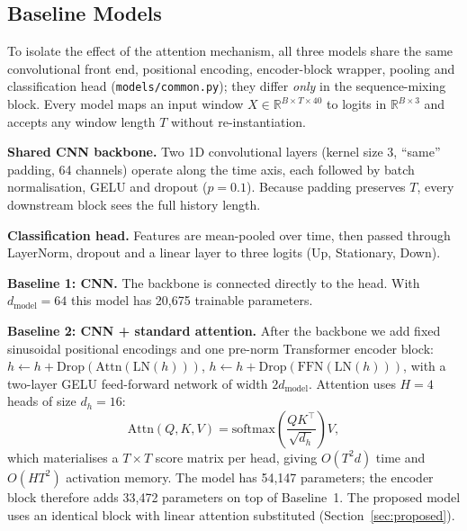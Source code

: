 \subsection{Baseline Models}
\label{sec:baselines}

To isolate the effect of the attention mechanism, all three models share
the same convolutional front end, positional encoding, encoder-block wrapper,
pooling and classification head (\texttt{models/common.py}); they differ
\emph{only} in the sequence-mixing block. Every model maps an input window
$X \in \mathbb{R}^{B \times T \times 40}$ to logits in
$\mathbb{R}^{B \times 3}$ and accepts any window length $T$ without
re-instantiation.

\textbf{Shared CNN backbone.} Two 1D convolutional layers (kernel size 3,
``same'' padding, 64 channels) operate along the time axis, each followed
by batch normalisation, GELU and dropout ($p=0.1$). Because padding
preserves $T$, every downstream block sees the full history length.

\textbf{Classification head.} Features are mean-pooled over time, then
passed through LayerNorm, dropout and a linear layer to three logits
(Up, Stationary, Down).

\textbf{Baseline 1: CNN.} The backbone is connected directly to the head.
With $d_{\text{model}}=64$ this model has 20{,}675 trainable parameters.

\textbf{Baseline 2: CNN + standard attention.} After the backbone we add
fixed sinusoidal positional encodings and one pre-norm Transformer encoder
block: $h \leftarrow h + \mathrm{Drop}(\mathrm{Attn}(\mathrm{LN}(h)))$,
$h \leftarrow h + \mathrm{Drop}(\mathrm{FFN}(\mathrm{LN}(h)))$, with a
two-layer GELU feed-forward network of width $2 d_{\text{model}}$.
Attention uses $H=4$ heads of size $d_h = 16$:
\begin{equation}
  \mathrm{Attn}(Q,K,V) = \mathrm{softmax}\!\left(\frac{QK^{\top}}{\sqrt{d_h}}\right) V ,
\end{equation}
which materialises a $T \times T$ score matrix per head, giving $O(T^2 d)$
time and $O(H T^2)$ activation memory. The model has 54{,}147 parameters;
the encoder block therefore adds 33{,}472 parameters on top of Baseline~1.
The proposed model uses an identical block with linear attention
substituted (Section~\ref{sec:proposed}).

